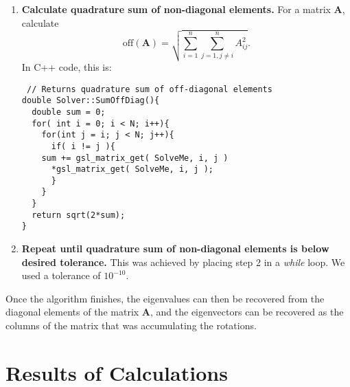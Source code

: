 \documentclass[a4paper,12pt]{report}
\begin{document}
\begin{enumerate}
\item \textbf{Calculate quadrature sum of non-diagonal elements.} For a matrix $\mathbf{A}$, calculate
\[
\mathrm{off}(\mathbf{A}) = \sqrt{\sum_{i=1}^n\sum_{j=1,j\ne i}^n A_{ij}^2}.
\]
In C++ code, this is:
\begin{verbatim}
 // Returns quadrature sum of off-diagonal elements
double Solver::SumOffDiag(){
  double sum = 0;
  for( int i = 0; i < N; i++){
    for(int j = i; j < N; j++){
      if( i != j ){
	sum += gsl_matrix_get( SolveMe, i, j )
	  *gsl_matrix_get( SolveMe, i, j );
      }
    }
  }
  return sqrt(2*sum);
}
\end{verbatim}
\item \textbf{Repeat until quadrature sum of non-diagonal elements is below desired tolerance.} This was achieved by placing step 2 in a \textit{while} loop. We used a tolerance of $10^{-10}$. 
\end{enumerate}
\doublespacing 
 Once the algorithm finishes, the eigenvalues can then be recovered from the diagonal elements of the matrix $\mathbf{A}$, and the eigenvectors can be recovered as the columns of the matrix that was accumulating the rotations.

\section{Results of Calculations}\label{sec:results}
\end{document}
